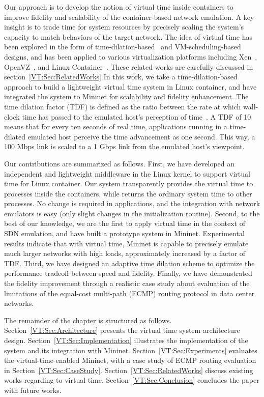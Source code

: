 Our approach is to develop the notion of virtual time inside containers to improve fidelity and scalability of the container-based network emulation. 
A key insight is to trade time for system resources by precisely scaling the system's capacity to match behaviors of the target network. 
The idea of virtual time has been explored in the form of time-dilation-based~\cite{ToInfinityBeyond} and VM-scheduling-based~\cite{VirtTimeOpenVZ, SliceTime} designs,
and has been applied to various virtualization platforms including Xen~\cite{DieCast}, OpenVZ~\cite{VirtTimeOpenVZ},
and Linux Container~\cite{TimeKeeper}.
These related works are carefully discussed in section~\ref{VT:Sec:RelatedWorks}
In this work, we take a time-dilation-based approach to build a lightweight virtual time system in Linux container, and have integrated the system to Mininet for scalability and fidelity enhancement. 
The time dilation factor (TDF) is defined as the ratio between the rate at which wall-clock time has passed to the emulated host's perception of time~\cite{ToInfinityBeyond}. 
A TDF of 10 means that for every ten seconds of real time, applications running in a time-dilated emulated host perceive the time advancement as one second. This way, a 100 Mbps link is scaled to a 1 Gbps link from the emulated host's viewpoint.

Our contributions are summarized as follows. 
First, we have developed an independent and lightweight middleware in the Linux kernel to support virtual time for Linux container. 
Our system transparently provides the virtual time to processes inside the containers, while returns the ordinary system time to other processes. %
No change is required in applications, and the integration with network emulators is easy (only slight changes in the initialization routine). 
Second, to the best of our knowledge, we are the first to apply virtual time in the context of SDN emulation, and have built a prototype system in Mininet. 
Experimental results indicate that with virtual time, Mininet is capable to precisely emulate much larger networks with high loads, approximately increased by a factor of TDF. 
Third, we have designed an adaptive time dilation scheme to optimize the performance tradeoff between speed and fidelity. 
Finally, we have demonstrated the fidelity improvement through a realistic case study about evaluation of the limitations of
the equal-cost multi-path (ECMP) routing protocol in data center networks.

The remainder of the chapter is structured as follows. Section~\ref{VT:Sec:Architecture} presents the virtual time system architecture design. 
Section~\ref{VT:Sec:Implementation} illustrates the implementation of the system and its integration with Mininet.
Section~\ref{VT:Sec:Experiments} evaluates the virtual-time-enabled Mininet, with a case study of ECMP routing evaluation in Section~\ref{VT:Sec:CaseStudy}. 
Section~\ref{VT:Sec:RelatedWorks} discuss existing works regarding to virtual time. Section~\ref{VT:Sec:Conclusion} concludes the paper with future works.
